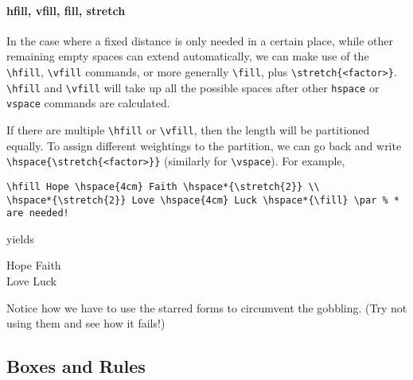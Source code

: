 \paragraph{hfill, vfill, fill, stretch} In the case where a fixed distance is only needed in a certain place, while other remaining empty spaces can extend automatically, we can make use of the \texttt{\textbackslash hfill}, \texttt{\textbackslash vfill} commands, or more generally \texttt{\textbackslash fill}, plus \texttt{\textbackslash stretch\{<factor>\}}. \texttt{\textbackslash hfill} and \texttt{\textbackslash vfill} will take up all the possible spaces after other \texttt{\text hspace} or \texttt{\text vspace} commands are calculated.

If there are multiple \texttt{\textbackslash hfill} or \texttt{\textbackslash vfill}, then the length will be partitioned equally. To assign different weightings to the partition, we can go back and write \texttt{\textbackslash hspace\{\textbackslash stretch\{<factor>\}\}} (similarly for \texttt{\textbackslash vspace}). For example,
\begin{lstlisting}
\hfill Hope \hspace{4cm} Faith \hspace*{\stretch{2}} \\
\hspace*{\stretch{2}} Love \hspace{4cm} Luck \hspace*{\fill} \par % * are needed!
\end{lstlisting}
yields \par
\hfill Hope \hspace{4cm} Faith  \\
 Love \hspace{4cm} Luck \hspace*{\fill} \par
Notice how we have to use the starred forms to circumvent the gobbling. (Try not using them and see how it fails!)

\subsection{Boxes and Rules}

